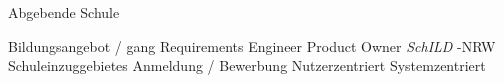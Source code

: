 Abgebende Schule

Bildungsangebot / gang
Requirements Engineer
Product Owner
 \textit{SchILD} -NRW
Schuleinzuggebietes
Anmeldung / Bewerbung
Nutzerzentriert
Systemzentriert